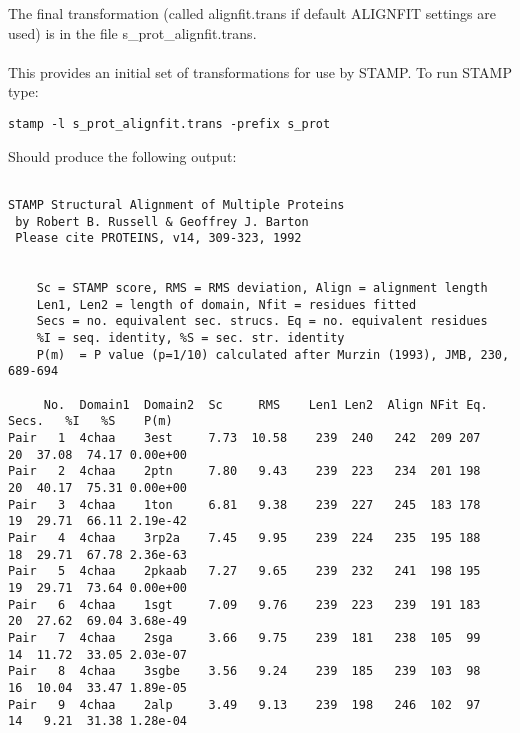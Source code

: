 The final transformation 
(called alignfit.trans if default ALIGNFIT settings are used) is
in the file s\_prot\_alignfit.trans.\\
\\
This provides an initial set of transformations for use by
STAMP.  To run STAMP type:

\begin{scriptsize}\begin{verbatim}
stamp -l s_prot_alignfit.trans -prefix s_prot 
\end{verbatim} \end{scriptsize}

Should produce the following output:\\
\begin{scriptsize}\begin{verbatim}

STAMP Structural Alignment of Multiple Proteins
 by Robert B. Russell & Geoffrey J. Barton 
 Please cite PROTEINS, v14, 309-323, 1992


    Sc = STAMP score, RMS = RMS deviation, Align = alignment length
    Len1, Len2 = length of domain, Nfit = residues fitted
    Secs = no. equivalent sec. strucs. Eq = no. equivalent residues
    %I = seq. identity, %S = sec. str. identity
    P(m)  = P value (p=1/10) calculated after Murzin (1993), JMB, 230, 689-694

     No.  Domain1  Domain2  Sc     RMS    Len1 Len2  Align NFit Eq. Secs.   %I   %S    P(m)
Pair   1  4chaa    3est     7.73  10.58    239  240   242  209 207   20  37.08  74.17 0.00e+00 
Pair   2  4chaa    2ptn     7.80   9.43    239  223   234  201 198   20  40.17  75.31 0.00e+00 
Pair   3  4chaa    1ton     6.81   9.38    239  227   245  183 178   19  29.71  66.11 2.19e-42 
Pair   4  4chaa    3rp2a    7.45   9.95    239  224   235  195 188   18  29.71  67.78 2.36e-63 
Pair   5  4chaa    2pkaab   7.27   9.65    239  232   241  198 195   19  29.71  73.64 0.00e+00 
Pair   6  4chaa    1sgt     7.09   9.76    239  223   239  191 183   20  27.62  69.04 3.68e-49 
Pair   7  4chaa    2sga     3.66   9.75    239  181   238  105  99   14  11.72  33.05 2.03e-07 
Pair   8  4chaa    3sgbe    3.56   9.24    239  185   239  103  98   16  10.04  33.47 1.89e-05 
Pair   9  4chaa    2alp     3.49   9.13    239  198   246  102  97   14   9.21  31.38 1.28e-04 


\end{verbatim}
\end{scriptsize}
